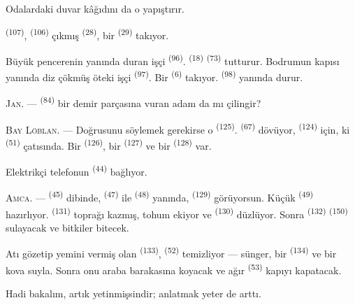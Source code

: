 Odalardaki duvar kâğıdını da o yapıştırır.

 \textsuperscript{(107)}, 
\textsuperscript{(106)} çıkmış  \textsuperscript{(28)},
bir  \textsuperscript{(29)} takıyor.

Büyük pencerenin yanında duran işçi 
\textsuperscript{(96)}.  \textsuperscript{(18)}
 \textsuperscript{(73)} tutturur. Bodrumun kapısı yanında diz
çökmüş öteki işçi  \textsuperscript{(97)}. Bir
 \textsuperscript{(6)} takıyor. 
\textsuperscript{(98)} yanında durur.

\textsc{Jan}. ---  \textsuperscript{(84)} bir demir parçasına
vuran adam da mı çilingir?

\textsc{Bay Löblan}. --- Doğrusunu söylemek gerekirse o 
\textsuperscript{(125)}.  \textsuperscript{(67)}
dövüyor,  \textsuperscript{(124)} için, ki
 \textsuperscript{(51)} çatısında. Bir 
\textsuperscript{(126)}, bir  \textsuperscript{(127)} ve bir
 \textsuperscript{(128)} var.

Elektrikçi telefonun  \textsuperscript{(44)} bağlıyor.

\VUsaut{3.0mm}

\textsc{Amca}. ---  \textsuperscript{(45)} dibinde,
 \textsuperscript{(47)} ile 
\textsuperscript{(48)} yanında,  \textsuperscript{(129)}
görüyorsun. Küçük  \textsuperscript{(49)} hazırlıyor.
 \textsuperscript{(131)} toprağı kazmış, tohum ekiyor ve
 \textsuperscript{(130)} düzlüyor. Sonra
 \textsuperscript{(132)} 
\textsuperscript{(150)} sulayacak ve bitkiler bitecek.

Atı gözetip yemini vermiş olan  \textsuperscript{(133)},
 \textsuperscript{(52)} temizliyor --- sünger, bir
 \textsuperscript{(134)} ve bir kova suyla. Sonra onu
araba barakasına koyacak ve ağır  \textsuperscript{(53)}
kapıyı kapatacak.

Hadi bakalım, artık yetinmişsindir; anlatmak yeter de arttı.

